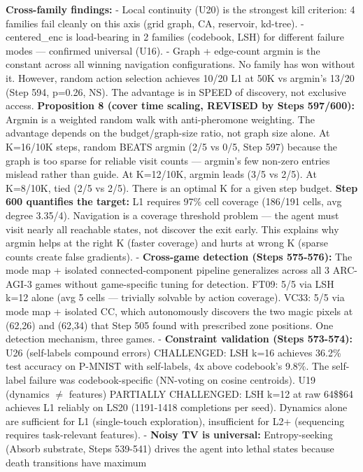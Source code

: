 \documentclass[
  11pt,
]{article}
\begin{document}
\textbf{Cross-family findings:} - Local continuity (U20) is the
strongest kill criterion: 4 families fail cleanly on this axis (grid
graph, CA, reservoir, kd-tree). - centered\_enc is load-bearing in 2
families (codebook, LSH) for different failure modes --- confirmed
universal (U16). - Graph + edge-count argmin is the constant across all
winning navigation configurations. No family has won without it.
However, random action selection achieves 10/20 L1 at 50K vs argmin's
13/20 (Step 594, p=0.26, NS). The advantage is in SPEED of discovery,
not exclusive access. \textbf{Proposition 8 (cover time scaling, REVISED
by Steps 597/600):} Argmin is a weighted random walk with anti-pheromone
weighting. The advantage depends on the budget/graph-size ratio, not
graph size alone. At K=16/10K steps, random BEATS argmin (2/5 vs 0/5,
Step 597) because the graph is too sparse for reliable visit counts ---
argmin's few non-zero entries mislead rather than guide. At K=12/10K,
argmin leads (3/5 vs 2/5). At K=8/10K, tied (2/5 vs 2/5). There is an
optimal K for a given step budget. \textbf{Step 600 quantifies the
target:} L1 requires 97\% cell coverage (186/191 cells, avg degree
3.35/4). Navigation is a coverage threshold problem --- the agent must
visit nearly all reachable states, not discover the exit early. This
explains why argmin helps at the right K (faster coverage) and hurts at
wrong K (sparse counts create false gradients). - \textbf{Cross-game
detection (Steps 575-576):} The mode map + isolated connected-component
pipeline generalizes across all 3 ARC-AGI-3 games without game-specific
tuning for detection. FT09: 5/5 via LSH k=12 alone (avg 5 cells ---
trivially solvable by action coverage). VC33: 5/5 via mode map +
isolated CC, which autonomously discovers the two magic pixels at
(62,26) and (62,34) that Step 505 found with prescribed zone positions.
One detection mechanism, three games. - \textbf{Constraint validation
(Steps 573-574):} U26 (self-labels compound errors) CHALLENGED: LSH k=16
achieves 36.2\% test accuracy on P-MNIST with self-labels, 4x above
codebook's 9.8\%. The self-label failure was codebook-specific
(NN-voting on cosine centroids). U19 (dynamics \(\neq\) features)
PARTIALLY CHALLENGED: LSH k=12 at raw 64\$\times\$64 achieves L1
reliably on LS20 (1191-1418 completions per seed). Dynamics alone are
sufficient for L1 (single-touch exploration), insufficient for L2+
(sequencing requires task-relevant features). - \textbf{Noisy TV is
universal:} Entropy-seeking (Absorb substrate, Steps 539-541) drives the
agent into lethal states because death transitions have maximum
\end{document}
